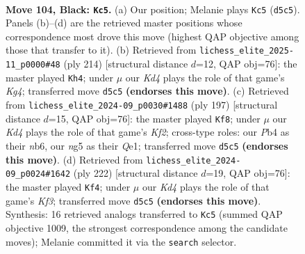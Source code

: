 \documentclass[11pt]{article}
\begin{document}
\clearpage

\begin{figure}[p]\centering
\begin{subfigure}{0.46\textwidth}\centering
\resizebox{\linewidth}{!}{%
\newchessgame
\chessboard[
  setfen={8/8/4Q3/3k2N1/1p6/4K3/4B3/8 b - - 2 104},
  showmover=false,
  pgfstyle=straightmove, color=movearrow, markmove={d5-c5}
]}
\caption{}
\end{subfigure}\hfill
\begin{subfigure}{0.46\textwidth}\centering
\resizebox{\linewidth}{!}{%
\newchessgame
\chessboard[
  setfen={8/8/4n3/8/6K1/5q2/4k3/8 w - - 2 108},
  showmover=false,
  pgfstyle=straightmove, color=movearrow, markmove={g4-h4}
]}
\caption{}
\end{subfigure}
\\[4pt]
\begin{subfigure}{0.46\textwidth}\centering
\resizebox{\linewidth}{!}{%
\newchessgame
\chessboard[
  setfen={8/5k2/1N4Q1/5K2/8/8/8/4q3 b - - 29 99},
  showmover=false,
  pgfstyle=straightmove, color=movearrow, markmove={f7-f8}
]}
\caption{}
\end{subfigure}\hfill
\begin{subfigure}{0.46\textwidth}\centering
\resizebox{\linewidth}{!}{%
\newchessgame
\chessboard[
  setfen={8/8/8/8/8/5K2/3kq3/8 w - - 1 112},
  showmover=false,
  pgfstyle=straightmove, color=movearrow, markmove={f3-f4}
]}
\caption{}
\end{subfigure}
\caption{\textbf{Move 104, Black: \texttt{Kc5}.} (a) Our position; Melanie plays \texttt{Kc5} (\texttt{d5c5}). Panels (b)--(d) are the retrieved master positions whose correspondence most drove this move (highest QAP objective among those that transfer to it). (b) Retrieved from \texttt{lichess\_elite\_2025-11\_p0000\#48} (ply 214) [structural distance $d$=12, QAP obj=76]: the master played \texttt{Kh4}; under $\mu$ our \emph{Kd4} plays the role of that game's \emph{Kg4}; transferred move \texttt{d5c5} \textbf{(endorses this move)}. (c) Retrieved from \texttt{lichess\_elite\_2024-09\_p0030\#1488} (ply 197) [structural distance $d$=15, QAP obj=76]: the master played \texttt{Kf8}; under $\mu$ our \emph{Kd4} plays the role of that game's \emph{Kf2}; cross-type roles: our \emph{P}b4 as their \emph{n}b6, our \emph{n}g5 as their \emph{Q}e1; transferred move \texttt{d5c5} \textbf{(endorses this move)}. (d) Retrieved from \texttt{lichess\_elite\_2024-09\_p0024\#1642} (ply 222) [structural distance $d$=19, QAP obj=76]: the master played \texttt{Kf4}; under $\mu$ our \emph{Kd4} plays the role of that game's \emph{Kf3}; transferred move \texttt{d5c5} \textbf{(endorses this move)}. Synthesis: 16 retrieved analogs transferred to \texttt{Kc5} (summed QAP objective 1009, the strongest correspondence among the candidate moves); Melanie committed it via the \texttt{search} selector.}
\label{fig:thought-m207}
\end{figure}
\end{document}
